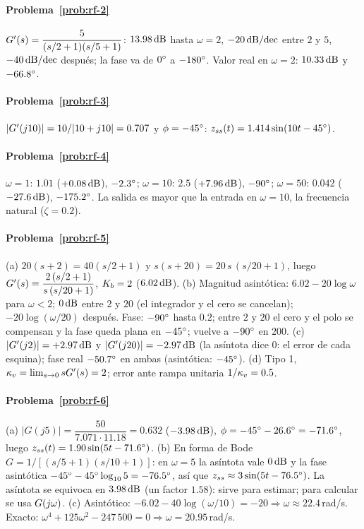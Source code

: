 \paragraph{Problema~\ref{prob:rf-2}}
$G'(s)=\dfrac{5}{(s/2+1)(s/5+1)}$: $13.98\,\mathrm{dB}$ hasta $\omega=2$, $-20\,\mathrm{dB/dec}$ entre $2$ y $5$, $-40\,\mathrm{dB/dec}$ después; la fase va de $0^{\circ}$ a $-180^{\circ}$. Valor real en $\omega=2$: $10.33\,\mathrm{dB}$ y $-66.8^{\circ}$.

\paragraph{Problema~\ref{prob:rf-3}}
$|G'(j10)|=10/|10+j10|=0.707$ y $\phi=-45^{\circ}$: $z_{ss}(t)=1.414\sin(10t-45^{\circ})$.

\paragraph{Problema~\ref{prob:rf-4}}
$\omega=1$: $1.01$ ($+0.08\,\mathrm{dB}$), $-2.3^{\circ}$; $\omega=10$: $2.5$ ($+7.96\,\mathrm{dB}$), $-90^{\circ}$; $\omega=50$: $0.042$ ($-27.6\,\mathrm{dB}$), $-175.2^{\circ}$. La salida es mayor que la entrada en $\omega=10$, la frecuencia natural ($\zeta=0.2$).

\paragraph{Problema~\ref{prob:rf-5}}
(a) $20(s+2)=40(s/2+1)$ y $s(s+20)=20\,s\,(s/20+1)$, luego $G'(s)=\dfrac{2\,(s/2+1)}{s\,(s/20+1)}$, $K_b=2$ ($6.02\,\mathrm{dB}$).
(b) Magnitud asintótica: $6.02-20\log\omega$ para $\omega<2$; $0\,\mathrm{dB}$ entre $2$ y $20$ (el integrador y el cero se cancelan); $-20\log(\omega/20)$ después. Fase: $-90^{\circ}$ hasta $0.2$; entre $2$ y $20$ el cero y el polo se compensan y la fase queda plana en $-45^{\circ}$; vuelve a $-90^{\circ}$ en $200$.
(c) $|G'(j2)|=+2.97\,\mathrm{dB}$ y $|G'(j20)|=-2.97\,\mathrm{dB}$ (la asíntota dice $0$: el error de cada esquina); fase real $-50.7^{\circ}$ en ambas (asintótica: $-45^{\circ}$).
(d) Tipo 1, $\kappa_v=\lim_{s\to0}sG'(s)=2$; error ante rampa unitaria $1/\kappa_v=0.5$.

\paragraph{Problema~\ref{prob:rf-6}}
(a) $|G(j5)|=\dfrac{50}{7.071\cdot11.18}=0.632$ ($-3.98\,\mathrm{dB}$), $\phi=-45^{\circ}-26.6^{\circ}=-71.6^{\circ}$, luego $z_{ss}(t)=1.90\sin(5t-71.6^{\circ})$.
(b) En forma de Bode $G=1/[(s/5+1)(s/10+1)]$: en $\omega=5$ la asíntota vale $0\,\mathrm{dB}$ y la fase asintótica $-45^{\circ}-45^{\circ}\log_{10}5=-76.5^{\circ}$, así que $z_{ss}\approx3\sin(5t-76.5^{\circ})$. La asíntota se equivoca en $3.98\,\mathrm{dB}$ (un factor $1.58$): sirve para estimar; para calcular se usa $G(j\omega)$.
(c) Asintótico: $-6.02-40\log(\omega/10)=-20\Rightarrow\omega\approx22.4$\,rad/s. Exacto: $\omega^4+125\omega^2-247\,500=0\Rightarrow\omega=20.95$\,rad/s.


\respuestaspausas

